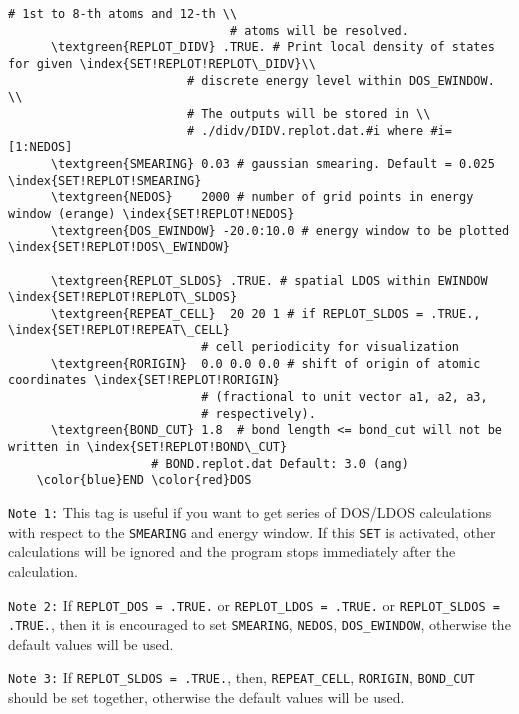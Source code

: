 \documentclass[a4paper,12pt]{scrartcl}
\newcommand{\textgreen}[1]{\textcolor{green!50!black}{\texttt{#1}}}
\begin{document}
\begin{description}
\begin{Verbatim}[commandchars=\\\{\},gobble=4, frame=single, framesep=2mm, 
    label= DOS setup example,
    labelposition=bottomline]
                               # 1st to 8-th atoms and 12-th \\
                               # atoms will be resolved.
      \textgreen{REPLOT_DIDV} .TRUE. # Print local density of states for given \index{SET!REPLOT!REPLOT\_DIDV}\\ 
                         # discrete energy level within DOS_EWINDOW. \\
                         # The outputs will be stored in \\ 
                         # ./didv/DIDV.replot.dat.#i where #i=[1:NEDOS]                           
      \textgreen{SMEARING} 0.03 # gaussian smearing. Default = 0.025 \index{SET!REPLOT!SMEARING}
      \textgreen{NEDOS}    2000 # number of grid points in energy window (erange) \index{SET!REPLOT!NEDOS}
      \textgreen{DOS_EWINDOW} -20.0:10.0 # energy window to be plotted \index{SET!REPLOT!DOS\_EWINDOW}
      
      \textgreen{REPLOT_SLDOS} .TRUE. # spatial LDOS within EWINDOW \index{SET!REPLOT!REPLOT\_SLDOS}
      \textgreen{REPEAT_CELL}  20 20 1 # if REPLOT_SLDOS = .TRUE.,  \index{SET!REPLOT!REPEAT\_CELL}
                           # cell periodicity for visualization
      \textgreen{RORIGIN}  0.0 0.0 0.0 # shift of origin of atomic coordinates \index{SET!REPLOT!RORIGIN}
                           # (fractional to unit vector a1, a2, a3, 
                           # respectively). 
      \textgreen{BOND_CUT} 1.8  # bond length <= bond_cut will not be written in \index{SET!REPLOT!BOND\_CUT}
                    # BOND.replot.dat Default: 3.0 (ang)                   
    \color{blue}END \color{red}DOS
 \end{Verbatim}

 \texttt{Note 1:} This tag is useful if you want to get series of DOS/LDOS 
 calculations with respect to the \texttt{SMEARING} and energy window.
 If this \texttt{SET} is activated, other calculations will be ignored and 
 the program stops immediately after the calculation. 
 
 \texttt{Note 2:} If \texttt{REPLOT\_DOS = .TRUE.} or \texttt{REPLOT\_LDOS = .TRUE.} or
\texttt{REPLOT\_SLDOS = .TRUE.}, then it is encouraged to set 
\texttt{SMEARING}, \texttt{NEDOS}, \texttt{DOS\_EWINDOW}, 
otherwise the default values will be used. 

 \texttt{Note 3:} If \texttt{REPLOT\_SLDOS = .TRUE.}, then, \texttt{REPEAT\_CELL},
 \texttt{RORIGIN}, \texttt{BOND\_CUT} should be set together, 
 otherwise the default values will be used. 
 

\end{description}
\end{document}
